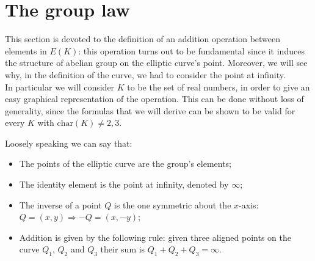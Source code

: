 \bigskip

\bigskip

\section{The group law}
\label{chpr:grouplaw}
This section is devoted to the definition of an addition operation between elements in $E(K)$: this operation turns out to be fundamental since it induces the structure of abelian group on the elliptic curve's point. Moreover, we will see why, in the definition of the curve, we had to consider the point at infinity.
\\
In particular we will consider $K$ to be the set of real numbers, in order to give an easy graphical representation of the operation. This can be done without loss of generality, since the formulas that we will derive can be shown to be valid for every $K$ with $\text{char}(K) \neq 2, 3$. 

\bigskip
\noindent
Loosely speaking we can say that:
\begin{itemize}
	\item The points of the elliptic curve are the group's elements;
	\item The identity element is the point at infinity, denoted by $\infty$;
	\item The inverse of a point $Q$ is the one symmetric about the $x$-axis: $Q = (x, y) \Longrightarrow -Q = (x, -y)$;
	\item Addition is given by the following rule: given three aligned points on the curve $Q_1$, $Q_2$ and $Q_3$ their sum is $Q_1 + Q_2 + Q_3 = \infty$.  
\end{itemize}

